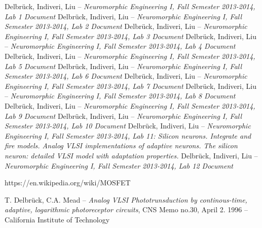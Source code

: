 \documentclass[main]{subfiles}
\begin{document}
\begin{thebibliography}{7}
Delbrück, Indiveri, Liu -- \emph{Neuromorphic Engineering I, Fall Semester 2013-2014, Lab 1 Document}
Delbrück, Indiveri, Liu -- \emph{Neuromorphic Engineering I, Fall Semester 2013-2014, Lab 2 Document}
Delbrück, Indiveri, Liu -- \emph{Neuromorphic Engineering I, Fall Semester 2013-2014, Lab 3 Document}
Delbrück, Indiveri, Liu -- \emph{Neuromorphic Engineering I, Fall Semester 2013-2014, Lab 4 Document}
Delbrück, Indiveri, Liu -- \emph{Neuromorphic Engineering I, Fall Semester 2013-2014, Lab 5 Document}
Delbrück, Indiveri, Liu -- \emph{Neuromorphic Engineering I, Fall Semester 2013-2014, Lab 6 Document}
Delbrück, Indiveri, Liu -- \emph{Neuromorphic Engineering I, Fall Semester 2013-2014, Lab 7 Document}
Delbrück, Indiveri, Liu -- \emph{Neuromorphic Engineering I, Fall Semester 2013-2014, Lab 8 Document}
Delbrück, Indiveri, Liu -- \emph{Neuromorphic Engineering I, Fall Semester 2013-2014, Lab 9 Document}
Delbrück, Indiveri, Liu -- \emph{Neuromorphic Engineering I, Fall Semester 2013-2014, Lab 10 Document}
Delbrück, Indiveri, Liu -- \emph{Neuromorphic Engineering I, Fall Semester 2013-2014, Lab 11: Silicon neurons. Integrate and fire models. Analog VLSI implementations of adaptive neurons. The silicon neuron: detailed VLSI model with adaptation properties. }
Delbrück, Indiveri, Liu -- \emph{Neuromorphic Engineering I, Fall Semester 2013-2014, Lab 12 Document}

https://en.wikipedia.org/wiki/MOSFET

T. Delbrück, C.A. Mead -- \emph{Analog VLSI Phototrunsduction by continous-time, adaptive, logarithmic photoreceptor circuits}, CNS Memo no.30, April 2. 1996 -- California Institute of Technology

\end{thebibliography}
\end{document}
